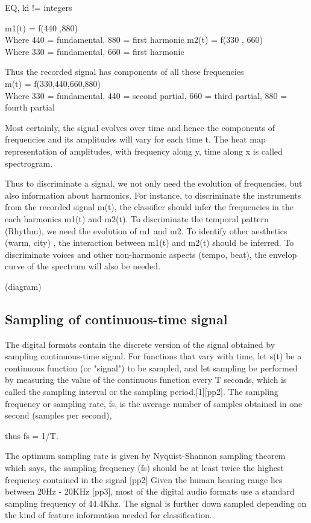 EQ, ki != integers

m1(t) = f(440 ,880) \\
   Where 440 = fundamental, 880 = first harmonic
m2(t) = f(330 , 660)\\
   Where 330 = fundamental, 660 = first harmonic
   
Thus the recorded signal has components of all these frequencies\\
  m(t) = f(330,440,660,880)\\
  Where 330 = fundamental, 440 = second partial, 660 = third partial, 880 = fourth partial
  
Most certainly, the signal evolves over time and hence the components of frequencies and its amplitudes will vary for each time t. The heat map representation of amplitudes, with frequency along y, time along   x is called spectrogram. 

Thus to discriminate a signal, we not only need the evolution of frequencies, but also information about harmonics. For instance, to discriminate the instruments from the recorded signal m(t), the classifier should infer the frequencies in the each harmonics m1(t) and m2(t). To discriminate the temporal pattern (Rhythm), we need the evolution of m1 and m2. To identify other aesthetics (warm, city) , the interaction between m1(t) and m2(t) should be inferred. To discriminate voices and other non-harmonic aspects (tempo, beat), the envelop curve of the spectrum will also be needed.    

(diagram)


\subsection{Sampling of continuous-time signal}
\label{sampling}
The digital formats contain the discrete version of the signal obtained by sampling continuous-time signal. For functions that vary with time, let s(t) be a continuous function (or "signal") to be sampled, and let sampling be performed by measuring the value of the continuous function every T seconds, which is called the sampling interval or the sampling period.[1][pp2]. The sampling frequency or sampling rate, fs, is the average number of samples obtained in one second (samples per second),  

thus fs = 1/T.

The optimum sampling rate is given by Nyquist-Shannon sampling theorem which says, the sampling frequency (fs) should be at least twice the highest frequency contained in the signal [pp2] Given the human hearing range lies between 20Hz - 20KHz [pp3], most of the digital audio formats use a standard sampling frequency of 44.4Khz. The signal is further down sampled depending on the kind of feature information needed for classification. 


